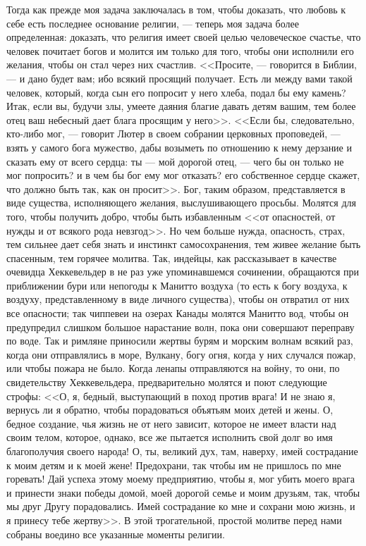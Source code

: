 \documentclass[12pt]{article}
\begin{document}
Тогда как прежде моя задача заключалась в том, чтобы доказать, что любовь к себе есть последнее основание религии, --- теперь моя задача более определенная: доказать, что религия имеет своей целью человеческое счастье, что человек почитает богов и молится им только для того, чтобы они исполнили его желания, чтобы он стал через них счастлив. <<Просите, --- говорится в Библии, --- и дано будет вам; ибо всякий просящий получает. Есть ли между вами такой человек, который, когда сын его попросит у него хлеба, подал бы ему камень? Итак, если вы, будучи злы, умеете даяния благие давать детям вашим, тем более отец ваш небесный дает блага просящим у него>>. <<Если бы, следовательно, кто-либо мог, --- говорит Лютер в своем собрании церковных проповедей, --- взять у самого бога мужество, дабы возыметь по отношению к нему дерзание и сказать ему от всего сердца: ты --- мой дорогой отец, --- чего бы он только не мог попросить? и в чем бы бог ему мог отказать? его собственное сердце скажет, что должно быть так, как он просит>>. Бог, таким образом, представляется в виде существа, исполняющего желания, выслушивающего просьбы. Молятся для того, чтобы получить добро, чтобы быть избавленным <<от опасностей, от нужды и от всякого рода невзгод>>. Но чем больше нужда, опасность, страх, тем сильнее дает себя знать и инстинкт самосохранения, тем живее желание быть спасенным, тем горячее молитва. Так, индейцы, как рассказывает в качестве очевидца Хеккевельдер в не раз уже упоминавшемся сочинении, обращаются при приближении бури или непогоды к Манитто воздуха (то есть к богу воздуха, к воздуху, представленному в виде личного существа), чтобы он отвратил от них все опасности; так чиппевеи на озерах Канады молятся Манитто вод, чтобы он предупредил слишком большое нарастание волн, пока они совершают переправу по воде. Так и римляне приносили жертвы бурям и морским волнам всякий раз, когда они отправлялись в море, Вулкану, богу огня, когда у них случался пожар, или чтобы пожара не было. Когда ленапы отправляются на войну, то они, по свидетельству Хеккевельдера, предварительно молятся и поют следующие строфы: <<О, я, бедный, выступающий в поход против врага! И не знаю я, вернусь ли я обратно, чтобы порадоваться объятьям моих детей и жены. О, бедное создание, чья жизнь не от него зависит, которое не имеет власти над своим телом, которое, однако, все же пытается исполнить свой долг во имя благополучия своего народа! О, ты, великий дух, там, наверху, имей сострадание к моим детям и к моей жене! Предохрани, так чтобы им не пришлось по мне горевать! Дай успеха этому моему предприятию, чтобы я, мог убить моего врага и принести знаки победы домой, моей дорогой семье и моим друзьям, так, чтобы мы друг Другу порадовались. Имей сострадание ко мне и сохрани мою жизнь, и я принесу тебе жертву>>. В этой трогательной, простой молитве перед нами собраны воедино все указанные моменты религии. 
\end{document}
